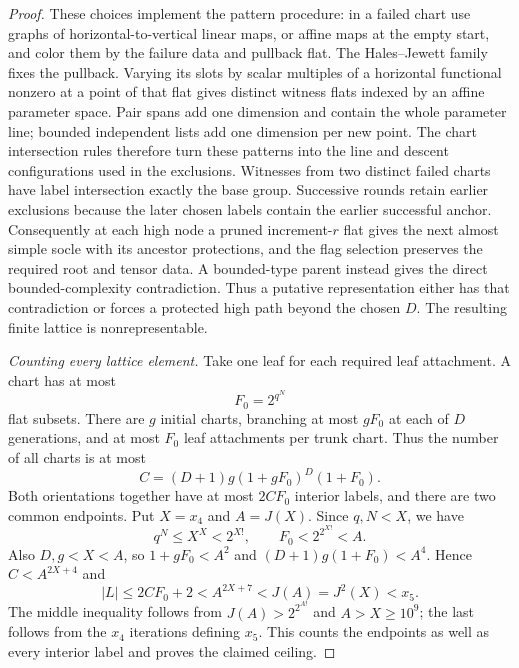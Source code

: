 \begin{proof}
These choices implement the pattern procedure: in a failed chart use
graphs of horizontal-to-vertical linear maps, or affine maps at the
empty start, and color them by the failure data and pullback flat.
The Hales--Jewett family fixes the pullback.  Varying its slots by
scalar multiples of a horizontal functional nonzero at a point of
that flat gives distinct witness flats indexed by an affine parameter
space.  Pair spans add one dimension and contain the whole parameter
line; bounded independent lists add one dimension per new point.
The chart intersection rules therefore turn these patterns into the
line and descent configurations used in the exclusions.  Witnesses
from two distinct failed charts have label intersection exactly the
base group.  Successive rounds retain earlier exclusions because
the later chosen labels contain the earlier successful anchor.
Consequently at each high node a pruned increment-$r$ flat gives the
next almost simple socle with its ancestor protections, and the flag
selection preserves the required root and tensor data.  A bounded-type
parent instead gives the direct bounded-complexity contradiction.
Thus a putative representation either has that contradiction or
forces a protected high path beyond the chosen $D$.  The resulting
finite lattice is nonrepresentable.

\emph{Counting every lattice element.}
Take one leaf for each required leaf attachment.  A chart has at most
\begin{equation}\label{q:flat-count}
                                F_0=2^{q^N}
\end{equation}
flat subsets.  There are $g$ initial charts, branching at most $gF_0$
at each of $D$ generations, and at most $F_0$ leaf attachments per
trunk chart.  Thus the number of all charts is at most
\begin{equation}\label{q:chart-count}
                  C=(D+1)g(1+gF_0)^D(1+F_0).
\end{equation}
Both orientations together have at most $2CF_0$ interior labels, and
there are two common endpoints.  Put $X=x_4$ and $A=J(X)$.  Since
$q,N<X$, we have
\[
                  q^N\le X^X<2^{X!},\qquad
                  F_0<2^{2^{X!}}<A.
\]
Also $D,g<X<A$, so $1+gF_0<A^2$ and
$(D+1)g(1+F_0)<A^4$.  Hence $C<A^{2X+4}$ and
\begin{equation}\label{q:strict-ceiling}
             |L|\le2CF_0+2<A^{2X+7}<J(A)=J^2(X)<x_5.
\end{equation}
The middle inequality follows from $J(A)>2^{2^{A!}}$ and
$A>X\ge10^9$; the last follows from the $x_4$ iterations defining
$x_5$.  This counts the endpoints as well as every interior label and
proves the claimed ceiling.
\end{proof}
